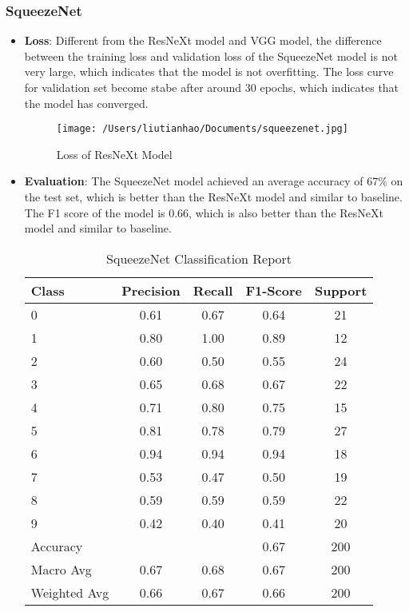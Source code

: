 \documentclass{article}
\begin{document}
\subsubsection{SqueezeNet}
\begin{itemize}
  \item \textbf{Loss}: 
  Different from the ResNeXt model and VGG model, the difference between the training loss and validation loss of the SqueezeNet model is not very large, which indicates that the model is not overfitting.
  The loss curve for validation set become stabe after around 30 epochs, which indicates that the model has converged.
  
  \begin{figure}[h]
    \centering
    \texttt{[image: /Users/liutianhao/Documents/squeezenet.jpg]}
    \caption{Loss of ResNeXt Model}
  \end{figure}

  \item \textbf{Evaluation}:
  The SqueezeNet model achieved an average accuracy of 67\% on the test set, which is better than the ResNeXt model and similar to baseline.
  The F1 score of the model is 0.66, which is also better than the ResNeXt model and similar to baseline.

  \begin{table}[ht]
    \centering
    \caption{SqueezeNet Classification Report}
    \begin{tabular}{lcccc}
      \toprule
      Class & Precision & Recall & F1-Score & Support \\
      \midrule
      0 & 0.61 & 0.67 & 0.64 & 21 \\
      1 & 0.80 & 1.00 & 0.89 & 12 \\
      2 & 0.60 & 0.50 & 0.55 & 24 \\
      3 & 0.65 & 0.68 & 0.67 & 22 \\
      4 & 0.71 & 0.80 & 0.75 & 15 \\
      5 & 0.81 & 0.78 & 0.79 & 27 \\
      6 & 0.94 & 0.94 & 0.94 & 18 \\
      7 & 0.53 & 0.47 & 0.50 & 19 \\
      8 & 0.59 & 0.59 & 0.59 & 22 \\
      9 & 0.42 & 0.40 & 0.41 & 20 \\
      \midrule
      Accuracy & & & 0.67 & 200 \\
      Macro Avg & 0.67 & 0.68 & 0.67 & 200 \\
      Weighted Avg & 0.66 & 0.67 & 0.66 & 200 \\
      \bottomrule
    \end{tabular}
  \end{table}
  
\end{itemize}
\end{document}
